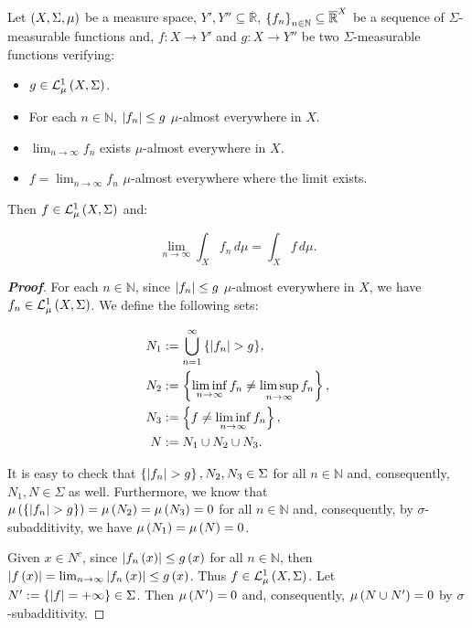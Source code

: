 \begin{theorem}\label{Dominated Convergence Theorem}
  Let $\left(X,\Sigma,\mu\right)$ be a measure space, $Y',Y''\subseteq\overline{\mathbb{R}}$, $\left\{f_n\right\}_{n\in\mathbb{N}}\subseteq\overline{\mathbb{R}}^X$ be a sequence of $\Sigma$-measurable functions and, $f:X\rightarrow Y'$ and $g:X\rightarrow Y''$ be two $\Sigma$-measurable functions verifying:

  \begin{itemize}
    \item $g\in\mathcal{L}^1_{\mu}\left(X,\Sigma\right)$.
    \item For each $n\in\mathbb{N}$, $\left|f_n\right|\leq g$ $\mu$-almost everywhere in $X$.
    \item $\lim_{n\to\infty}{f_n}$ exists $\mu$-almost everywhere in $X$.
    \item $f=\lim_{n\to\infty}{f_n}$ $\mu$-almost everywhere where the limit exists.
  \end{itemize}

  Then $f\in\mathcal{L}^1_{\mu}\left(X,\Sigma\right)$ and:

  \begin{equation}
    \lim_{n\to\infty}{\int_{X}{f_n\,d\mu}}=\int_{X}{f\,d\mu}.
  \end{equation}
  \begin{proof}[\rm\textbf{Proof}]
    For each $n\in\mathbb{N}$, since $\left|f_n\right|\leq g$ $\mu$-almost everywhere in $X$, we have $f_n\in\mathcal{L}^1_{\mu}\left(X,\Sigma\right)$. We define the following sets:

    \begin{equation}
      \begin{split}
        N_1 & :=\bigcup_{n=1}^{\infty}{\set{\bars{f_n}>g}},\\
        N_2 & :=\set{\liminf_{n\to\infty}{f_n}\neq\limsup_{n\to\infty}{f_n}},\\
        N_3 & :=\set{f\neq\liminf_{n\to\infty}{f_n}},\\
        N & :=N_1\cup N_2\cup N_3.
      \end{split}
    \end{equation}

    It is easy to check that $\set{\bars{f_n}>g},N_2,N_3\in\Sigma$ for all $n\in\mathbb{N}$ and, consequently, $N_1,N\in\Sigma$ as well. Furthermore, we know that $\mu\pr{\set{\bars{f_n}>g}}=\mu\pr{N_2}=\mu\pr{N_3}=0$ for all $n\in\mathbb{N}$ and, consequently, by $\sigma$-subadditivity, we have $\mu\left(N_1\right)=\mu\left(N\right)=0$.

    Given $x\in N^c$, since $\left|f_n\left(x\right)\right|\leq g\left(x\right)$ for all $n\in\mathbb{N}$, then $\left|f\left(x\right)\right|=\lim_{n\to\infty}{\left|f_n\left(x\right)\right|}\leq g\left(x\right)$. Thus $f\in\mathcal{L}^1_{\mu}\left(X,\Sigma\right)$. Let $N':=\left\{\left|f\right|=+\infty\right\}\in\Sigma$. Then $\mu\left(N'\right)=0$ and, consequently, $\mu\left(N\cup N'\right)=0$ by $\sigma$-subadditivity.


\end{proof}
\end{theorem}
